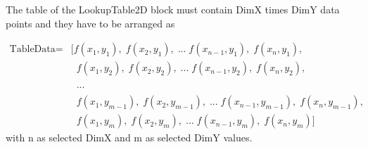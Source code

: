 %
%
%
%
%
%
%
%
The table of the LookupTable2D block must contain DimX times DimY data points and they have to be arranged as

\begin{align*}
\textrm{TableData} =& [f(x_1, y_1),\; f(x_2, y_1),\; ...\; f(x_{n-1}, y_1),\; f(x_{n},y_1),\\
                                 &   \phantom{[}\;f(x_1, y_2),\; f(x_2, y_2),\; ...\; f(x_{n-1}, y_2),\; f(x_{n},y_2),\\
                                 &  \phantom{[}\;...\\
                                 &  \phantom{[}\;f(x_1, y_{m-1}),\; f(x_2, y_{m-1}),\; ... \;f(x_{n-1}, y_{m-1}),\; f(x_{n},y_{m-1}),\\
                                 &  \phantom{[}\;f(x_1, y_{m}),\; f(x_2, y_{m}),\; ...\; f(x_{n-1}, y_{m}),\; f(x_{n},y_{m})]
\end{align*}
with n as selected DimX and m as selected DimY values.

